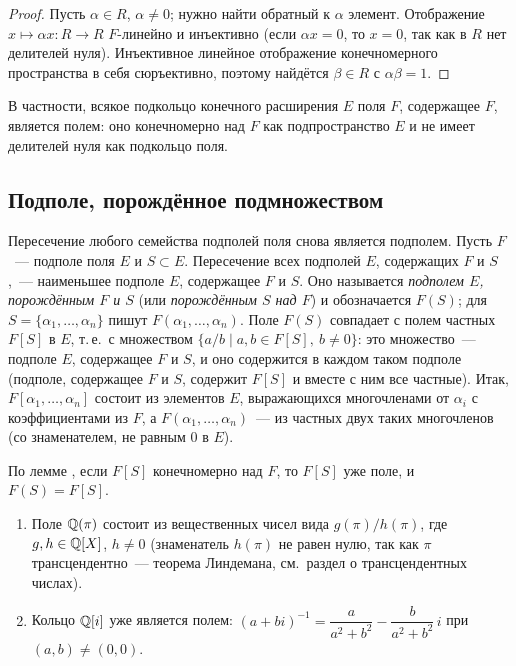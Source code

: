 \begin{proof}
Пусть $\alpha\in R$, $\alpha\ne0$; нужно найти обратный к $\alpha$ элемент. Отображение $x\mapsto\alpha x\colon R\to R$
$F$-линейно и инъективно (если $\alpha x=0$, то $x=0$, так как в $R$ нет делителей нуля). Инъективное линейное
отображение конечномерного пространства в себя сюръективно, поэтому найдётся $\beta\in R$ с $\alpha\beta=1$.
\end{proof}

В частности, всякое подкольцо конечного расширения $E$ поля $F$, содержащее $F$, является полем: оно конечномерно над $F$
как подпространство $E$ и не имеет делителей нуля как подкольцо поля.

\subsection*{Подполе, порождённое подмножеством}

Пересечение любого семейства подполей поля снова является подполем. Пусть $F$~--- подполе поля $E$ и $S\subset E$.
Пересечение всех подполей $E$, содержащих $F$ и $S$,~--- наименьшее подполе $E$, содержащее $F$ и $S$. Оно называется
\emph{подполем $E$, порождённым $F$ и $S$} (или \emph{порождённым $S$ над $F$}) и обозначается $F(S)$; для
$S=\{\alpha_1,\dots,\alpha_n\}$ пишут $F(\alpha_1,\dots,\alpha_n)$. Поле $F(S)$ совпадает с полем частных $F[S]$ в $E$,
т.\,е.\ с множеством $\{a/b\mid a,b\in F[S],\ b\ne0\}$: это множество~--- подполе $E$, содержащее $F$ и $S$, и оно содержится
в каждом таком подполе (подполе, содержащее $F$ и $S$, содержит $F[S]$ и вместе с ним все частные). Итак,
$F[\alpha_1,\dots,\alpha_n]$ состоит из элементов $E$, выражающихся многочленами от $\alpha_i$ с коэффициентами из $F$, а
$F(\alpha_1,\dots,\alpha_n)$~--- из частных двух таких многочленов (со знаменателем, не равным $0$ в $E$).

По лемме , если $F[S]$ конечномерно над $F$, то $F[S]$ уже поле, и $F(S)=F[S]$.

\begin{example}[1.24]
\begin{enumerate}[label=(\alph*),leftmargin=*]
\item Поле $\mathbb Q(\pi)$ состоит из вещественных чисел вида $g(\pi)/h(\pi)$, где $g,h\in\mathbb Q[X]$, $h\ne0$ (знаменатель $h(\pi)$ не
равен нулю, так как $\pi$ трансцендентно~--- теорема Линдемана, см.\ раздел о трансцендентных числах).
\item Кольцо $\mathbb Q[i]$ уже является полем: $(a+bi)^{-1}=\dfrac{a}{a^2+b^2}-\dfrac{b}{a^2+b^2}\,i$ при $(a,b)\ne(0,0)$.
\end{enumerate}
\end{example}

